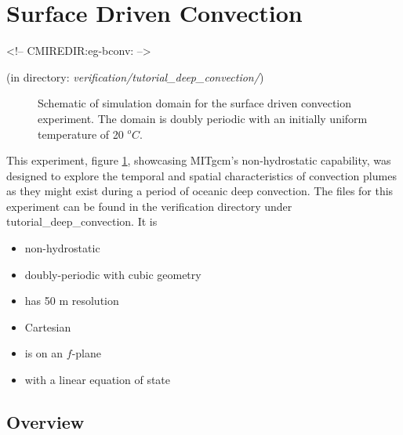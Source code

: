 \section{Surface Driven Convection}
\label{sec:eg-bconv}
\begin{rawhtml}
<!-- CMIREDIR:eg-bconv: -->
\end{rawhtml}
\begin{center}
(in directory: {\it verification/tutorial\_deep\_convection/})
\end{center}


%
%

\begin{figure}
\begin{center}
\end{center}
\caption{Schematic of simulation domain 
for the surface driven convection experiment. The domain is doubly periodic
with an initially uniform temperature of 20 $^oC$. 
}
\label{fig:eg-bconv-simulation_config}
\end{figure}

This experiment, figure \ref{fig:eg-bconv-simulation_config}, showcasing MITgcm's non-hydrostatic 
capability, was designed to explore 
the temporal and spatial characteristics of convection plumes as they might exist during a 
period of oceanic deep convection. The files for this experiment can be found in the verification
directory under tutorial\_deep\_convection. It is

\begin{itemize}
\item non-hydrostatic 
\item doubly-periodic with cubic geometry
\item has 50 m resolution 
\item Cartesian  
\item is on an $f$-plane 
\item with a linear equation of state 
\end{itemize}

\subsection{Overview}

